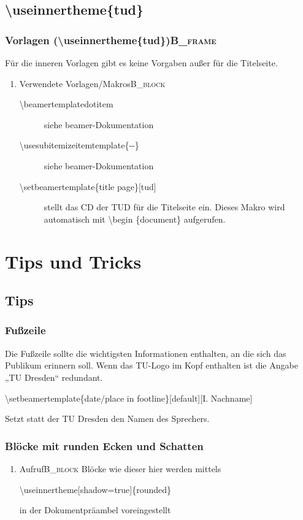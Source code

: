 \documentclass[presentation,t]{beamer}
\begin{document}
\subsection{\textbackslash useinnertheme\{tud\}}
\label{sec:org45e30c8}

\subsubsection[Vorlagen (\textbackslash useinnertheme\{tud\})]{Vorlagen (\textbackslash useinnertheme\{tud\})\hfill{}\textsc{B\_frame}}
\label{sec:org1afa858}
Für die inneren Vorlagen gibt es keine Vorgaben außer für die
Titelseite.
\begin{enumerate}
\item Verwendete Vorlagen/Makros\hfill{}\textsc{B\_block}
\label{sec:orge32de70}
\begin{description}
\item[{\textbackslash beamertemplatedotitem}] siehe beamer-Dokumentation
\item[{\textbackslash usesubitemizeitemtemplate\{-\/-\}}] siehe
beamer-Dokumentation
\item[{\textbackslash setbeamertemplate\{title page\}[tud]}] stellt das CD
der TUD für die Titelseite ein. Dieses Makro wird automatisch mit
\textbackslash begin \{document\} aufgerufen.
\end{description}
\end{enumerate}

\section{Tips und Tricks}
\label{sec:orgfe60708}
\subsection{Tips}
\label{sec:org8b12365}
\subsubsection{Fußzeile}
\label{sec:org47ce108}
Die Fußzeile sollte die wichtigsten Informationen enthalten, an die
sich das Publikum erinnern soll. Wenn das TU-Logo im Kopf enthalten
ist die Angabe „TU Dresden“ redundant.

\textbackslash setbeamertemplate\{date/place in
footline\}[default][I. Nachname]

Setzt statt der TU Dresden den Namen
des Sprechers.
\subsubsection{Blöcke mit runden Ecken und Schatten}
\label{sec:orga04af27}
\begin{enumerate}
\item Aufruf\hfill{}\textsc{B\_block}
\label{sec:orgcf75c7f}
Blöcke wie dieser hier werden mittels 

\textbackslash useinnertheme[shadow=true]\{rounded\}

in der Dokumentpräambel voreingestellt
\end{enumerate}
\end{document}
